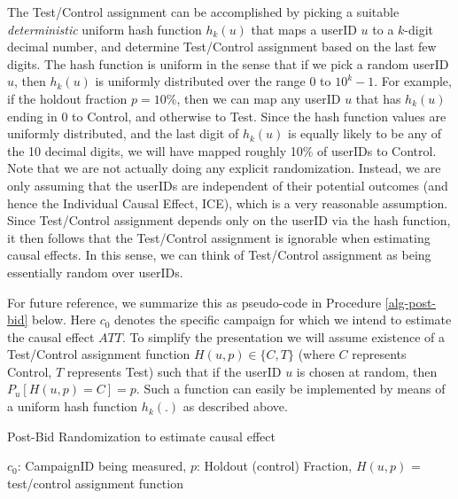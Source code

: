 \documentclass[11pt,a4paper]{article}
\theoremstyle{definition}
\theoremstyle{remark}
\theoremstyle{definition}
\theoremstyle{definition}
\theoremstyle{definition}
\theoremstyle{definition}
\theoremstyle{definition}
\theoremstyle{definition}
\begin{document}
The Test/Control assignment can be accomplished by picking a suitable {\em deterministic} uniform hash function $h_k(u)$ that maps a userID $u$ to a $k$-digit decimal number, and determine Test/Control assignment based on the last few digits. The hash function is uniform in the sense that if we pick a random userID $u$, then $h_k(u)$ is uniformly distributed over the range $0$ to $10^k-1$. For example, if the holdout fraction $p = 10\%$,  then we can map any userID $u$ that has $h_k(u)$ ending in 0 to Control, and otherwise to Test. Since the hash function values are uniformly distributed, and the last digit of $h_k(u)$ is equally likely to be any of the 10 decimal digits, we will have mapped roughly 10\% of userIDs to Control. Note that we are not actually doing any explicit randomization. Instead, we are only assuming that the userIDs are independent of their potential outcomes (and hence the Individual Causal Effect, ICE), which is a very reasonable assumption. Since Test/Control assignment depends only on the userID via the hash function, it then follows that the Test/Control assignment is ignorable when estimating causal effects. In this sense, we can think of Test/Control assignment as being essentially random over userIDs.  

For future reference, we summarize this as pseudo-code in Procedure \ref{alg-post-bid} below. Here $c_0$ denotes the specific campaign for which we intend to estimate the causal effect $ATT$. To simplify the presentation we will assume existence of a Test/Control assignment function 
$H(u,p) \in \{C,T\}$ (where $C$ represents Control, $T$ represents Test)
such that if the userID $u$ is chosen at random, then $P_u[ H(u,p) = C]= p$. Such a function can easily be implemented by means of a uniform hash function $h_k(.)$ as described above. 



\begin{algorithm} 
 \caption{\small Post-Bid Randomization to estimate causal effect}
    \label{alg-post-bid}
\begin{algorithmic}[1]
\Require 
$c_0$: CampaignID being measured, 
$p$: Holdout (control) Fraction,
$H(u,p)$ = test/control assignment function

 
 
     \label{phantom}
\Else    
	\EndIf
\EndIf
\EndWhile
\end{algorithmic}	
\end{algorithm}
\end{document}
